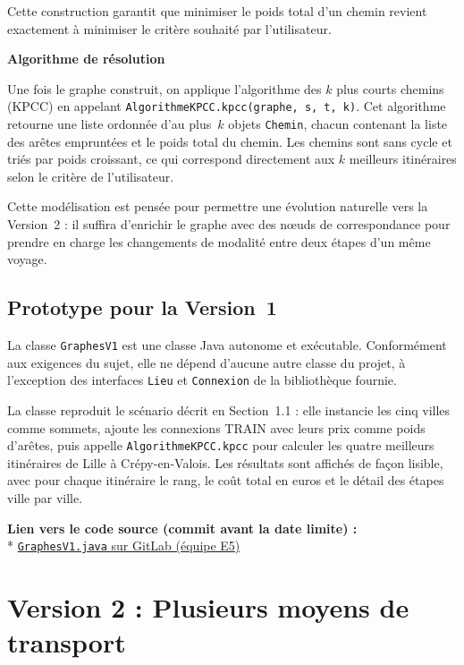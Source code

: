\documentclass[fontsize=10pt,oneside,parskip=half]{scrreprt}
\newcommand{\ic}[1]{{\setlength{\fboxsep}{2pt}\colorbox{BeigeSerein}{\texttt{#1}}}}
\begin{document}
Cette construction garantit que minimiser le poids total d'un chemin revient
exactement à minimiser le critère souhaité par l'utilisateur.

\noindent\textbf{Algorithme de résolution}

Une fois le graphe construit, on applique l'algorithme des $k$ plus courts chemins
(KPCC) en appelant \ic{AlgorithmeKPCC.kpcc(graphe,\,s,\,t,\,k)}. Cet algorithme
retourne une liste ordonnée d'au plus~$k$ objets \ic{Chemin}, chacun contenant la
liste des arêtes empruntées et le poids total du chemin. Les chemins sont sans
cycle et triés par poids croissant, ce qui correspond directement aux $k$ meilleurs
itinéraires selon le critère de l'utilisateur.

Cette modélisation est pensée pour permettre une évolution naturelle vers la
Version~2 : il suffira d'enrichir le graphe avec des nœuds de correspondance pour
prendre en charge les changements de modalité entre deux étapes d'un même voyage.

\section{Prototype pour la Version~1}

La classe \ic{GraphesV1} est une classe Java autonome et exécutable. Conformément
aux exigences du sujet, elle ne dépend d'aucune autre classe du projet, à
l'exception des interfaces \ic{Lieu} et \ic{Connexion} de la bibliothèque fournie.

La classe reproduit le scénario décrit en Section~1.1 : elle instancie les cinq
villes comme sommets, ajoute les connexions TRAIN avec leurs prix comme poids
d'arêtes, puis appelle \ic{AlgorithmeKPCC.kpcc} pour calculer les quatre meilleurs
itinéraires de Lille à Crépy-en-Valois. Les résultats sont affichés de façon
lisible, avec pour chaque itinéraire le rang, le coût total en euros et le détail
des étapes ville par ville.

\noindent\textbf{Lien vers le code source (commit avant la date limite) :}\\*
\href{https://gitlab.univ-lille.fr/sae2.01-2.02/2026/E5/-/blob/main/src/main/java/sae/transport/comparison/graphs/GraphesV1.java?ref_type=heads}{\ic{GraphesV1.java} sur GitLab (équipe E5)}

\chapter{Version 2 : Plusieurs moyens de transport}
\end{document}
